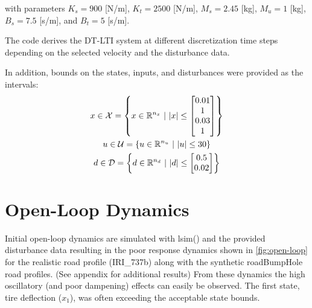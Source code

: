 \documentclass[onecolumn]{IEEEtran}
\newcommand{\R}{\mathbb{R}}
\newcommand{\st}{ \ | \ }
\begin{document}
with parameters $K_s = 900$ [N/m], $K_t = 2500$ [N/m], $M_s = 2.45$ [kg], $M_u = 1$ [kg], $B_s = 7.5$ [s/m], and $B_t = 5$ [s/m].

The code derives the DT-LTI system at different discretization time steps depending on the selected velocity and the disturbance data.

In addition, bounds on the states, inputs, and disturbances were provided as the intervals:
\begin{gather*}
    x \in \mathcal{X} = \qty{x\in \R^{n_x} \st \abs{x} \leq \mqty[0.01\\1\\0.03\\1]}
    \\
    u \in \mathcal{U} = \qty{u \in \R^{n_u} \st \abs{u} \leq 30}
    \\
    d \in \mathcal{D} = \qty{d \in \R^{n_d} \st \abs{d} \leq \mqty[0.5\\0.02]}
\end{gather*}


\section{Open-Loop Dynamics}
Initial open-loop dynamics are simulated with lsim() and the provided disturbance data resulting in the poor response dynamics shown in \autoref{fig:open-loop} for the realistic road profile (IRI\_737b) along with the synthetic roadBumpHole road profiles.
(See appendix for additional results)
From these dynamics the high oscillatory (and poor dampening) effects can easily be observed.
The first state, tire deflection ($x_1$), was often exceeding the acceptable state bounds.
\end{document}
